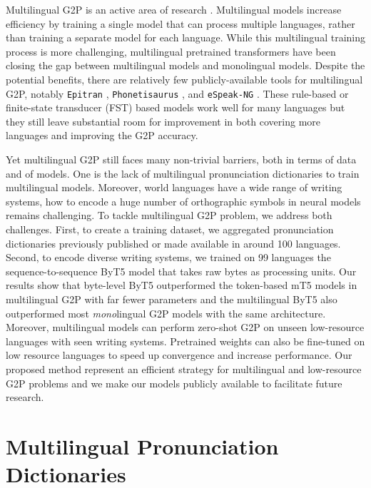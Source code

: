 \documentclass[a4paper]{article}
\begin{document}
Multilingual G2P is an active area of research \cite{deri-knight-2016-grapheme,peters-etal-2017-massively,hermjakob-etal-2018-box,hasegawa2020grapheme,gorman-etal-2020-sigmorphon,yu2020multilingual,vesik-etal-2020-one}. Multilingual models increase efficiency by training a single model that can process multiple languages, rather than training a separate model for each language. While this multilingual training process is more challenging, multilingual pretrained transformers have been closing the gap between multilingual models and monolingual models. 
Despite the potential benefits, there are relatively few publicly-available tools for multilingual G2P, notably \texttt{Epitran} \cite{mortensen-etal-2018-epitran}, \texttt{Phonetisaurus} \cite{novak2016phonetisaurus}, and \texttt{eSpeak-NG} \cite{espeakng}. These rule-based or finite-state transducer (FST) based models work well for many languages but they still leave substantial room for improvement in both covering more languages and improving the G2P accuracy.

Yet multilingual G2P still faces many non-trivial barriers, both in terms of data and of models. One is the lack of multilingual pronunciation dictionaries to train multilingual models. Moreover, world languages have a wide range of writing systems, how to encode a huge number of orthographic symbols in neural models remains challenging. To tackle multilingual G2P problem, we address both challenges. First, to create a training dataset, we aggregated pronunciation dictionaries previously published or made available in around 100 languages. Second, to encode diverse writing systems, we trained on 99 languages the sequence-to-sequence ByT5 model that takes raw bytes as processing units. Our results show that byte-level ByT5 outperformed the token-based mT5 models in multilingual G2P with far fewer parameters and the multilingual ByT5 also outperformed most \textit{mono}lingual G2P models with the same architecture. Moreover, multilingual models can perform zero-shot G2P on unseen low-resource languages with seen writing systems. Pretrained weights can also be fine-tuned on low resource languages to speed up convergence and increase performance. Our proposed method represent an efficient strategy for multilingual and low-resource G2P problems and we make our models publicly available to facilitate future research.


\section{Multilingual Pronunciation Dictionaries}
\end{document}
